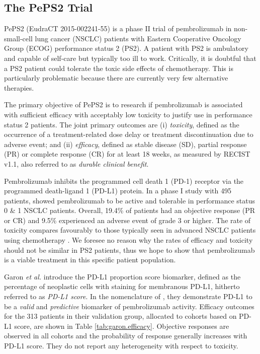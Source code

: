 \documentclass[alpha-refs]{wiley-article}
\begin{document}
\subsection{The PePS2 Trial}
\label{s:peps2}
PePS2 (EudraCT 2015-002241-55) is a phase II trial of pembrolizumab in non-small-cell lung cancer (NSCLC) patients with Eastern Cooperative Oncology Group (ECOG) performance status 2 (PS2).
A patient with PS2 is ambulatory and capable of self-care but typically too ill to work.
Critically, it is doubtful that a PS2 patient could tolerate the toxic side effects of chemotherapy.
This is particularly problematic because there are currently very few alternative therapies.

The primary objective of PePS2 is to research if pembrolizumab is associated with sufficient efficacy with acceptably low toxicity to justify use in performance status 2 patients.
The joint primary outcomes are (i) \textit{toxicity}, defined as the occurrence of a treatment-related dose delay or treatment discontinuation due to adverse event; 
and (ii) \textit{efficacy}, defined as stable disease (SD), partial response (PR) or complete response (CR) for at least 18 weeks, as measured by RECIST v1.1\citep{Eisenhauer2009}, also referred to as \textit{durable clinical benefit}.

Pembrolizumab inhibits the programmed cell death 1 (PD-1) receptor via the programmed death-ligand 1 (PD-L1) protein.
In a phase I study with 495 patients, \cite{Garon2015} showed pembrolizumab to be active and tolerable in performance status 0 \& 1 NSCLC patients.
Overall, 19.4\% of patients had an objective response (PR or CR) and 9.5\% experienced an adverse event of grade 3 or higher.
The rate of toxicity compares favourably to those typically seen in advanced NSCLC patients using chemotherapy \citep{Schiller2002, Borghaei2015}.
We foresee no reason why the rates of efficacy and toxicity should not be similar in PS2 patients, thus we hope to show that pembrolizumab is a viable treatment in this specific patient population.

Garon \textit{et al.} introduce the PD-L1 proportion score biomarker, defined as the percentage of neoplastic cells with staining for membranous PD-L1, hitherto referred to as \textit{PD-L1 score}.
In the nomenclature of \cite{Buyse2011}, they demonstrate PD-L1 to be a \textit{valid} and \textit{predictive} biomarker of pembrolizumab activity.
Efficacy outcomes for the 313 patients in their validation group, allocated to cohorts based on PD-L1 score, are shown in Table \ref{tab:garon.efficacy}.
Objective responses are observed in all cohorts and the probability of response generally increases with PD-L1 score.
They do not report any heterogeneity with respect to toxicity.
\end{document}
